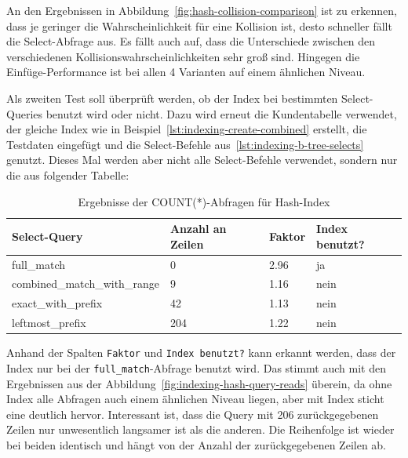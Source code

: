An den Ergebnissen in Abbildung~\ref{fig:hash-collision-comparison} ist zu erkennen, dass je geringer die Wahrscheinlichkeit für eine Kollision ist, desto schneller fällt die Select-Abfrage aus.
Es fällt auch auf, dass die Unterschiede zwischen den verschiedenen Kollisionswahrscheinlichkeiten sehr groß sind.
Hingegen die Einfüge-Performance ist bei allen 4 Varianten auf einem ähnlichen Niveau.

Als zweiten Test soll überprüft werden, ob der Index bei bestimmten Select-Queries benutzt wird oder nicht.
Dazu wird erneut die Kundentabelle verwendet, der gleiche Index wie in Beispiel~\ref{lst:indexing-create-combined} erstellt, die Testdaten eingefügt und die Select-Befehle aus~\ref{lst:indexing-b-tree-selects} genutzt.
Dieses Mal werden aber nicht alle Select-Befehle verwendet, sondern nur die aus folgender Tabelle:

\vspace{-4pt}
\begin{table}[H]
    \centering
    \scriptsize
    \begin{tabular}{|l|l|l|l|}
        \hline
        \textbf{Select-Query} & \textbf{Anzahl an Zeilen} & \textbf{Faktor} & \textbf{Index benutzt?} \\
        \hline
        full\_match & 0 & 2.96 & ja \\
        combined\_match\_with\_range & 9 & 1.16 & nein \\
        exact\_with\_prefix & 42 & 1.13 & nein \\
        leftmost\_prefix & 204 & 1.22 & nein \\
        \hline
    \end{tabular}
    \vspace{3pt}
    \caption{Ergebnisse der COUNT(*)-Abfragen für Hash-Index}
    \label{tab:indexing_hash_count_results}
\end{table}
\vspace{-30pt}

Anhand der Spalten \texttt{Faktor} und \texttt{Index benutzt?} kann erkannt werden, dass der Index nur bei der \texttt{full\_match}-Abfrage benutzt wird.
Das stimmt auch mit den Ergebnissen aus der Abbildung~\ref{fig:indexing-hash-query-reads} überein, da ohne Index alle Abfragen auch einem ähnlichen Niveau liegen, aber mit Index sticht eine deutlich hervor.
Interessant ist, dass die Query mit 206 zurückgegebenen Zeilen nur unwesentlich langsamer ist als die anderen.
Die Reihenfolge ist wieder bei beiden identisch und hängt von der Anzahl der zurückgegebenen Zeilen ab.

